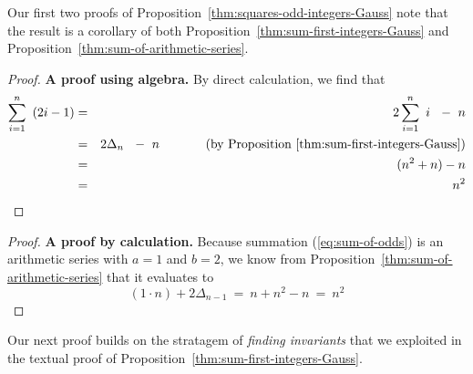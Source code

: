 \medskip

Our first two proofs of
Proposition~\ref{thm:squares-odd-integers-Gauss} note that the result
is a corollary of both Proposition~\ref{thm:sum-first-integers-Gauss}
and Proposition~\ref{thm:sum-of-arithmetic-series}.

\medskip

\begin{proof}
{\bf A proof using algebra.}
%
By direct calculation, we find that
\begin{eqnarray*}
\sum_{i=1}^n \ \left( 2i-1 \right)
   & = & 2 \sum_{i=1}^n \ i \ \ - \ n \\
   & = & 2 \Delta_n \ \ - \ n \ \ \ \ \ \ \ \ \ \ \mbox{ (by
  Proposition~\ref{thm:sum-first-integers-Gauss})} \\
   & = & (n^2 + n) - n \\
   & = & n^2
\end{eqnarray*}
\end{proof}

\medskip

\begin{proof}
{\bf A proof by calculation.}
%
Because summation (\ref{eq:sum-of-odds}) is an arithmetic series with
$a=1$ and $b=2$, we know from
Proposition~\ref{thm:sum-of-arithmetic-series} that it evaluates to
\[ (1 \cdot n) + 2 \Delta_{n-1} \ = \ n + n^2 -n \ = \ n^2 \]
\end{proof}


\medskip

Our next proof builds on the stratagem of {\em finding invariants} that we exploited in the textual proof of
Proposition~\ref{thm:sum-first-integers-Gauss}.

